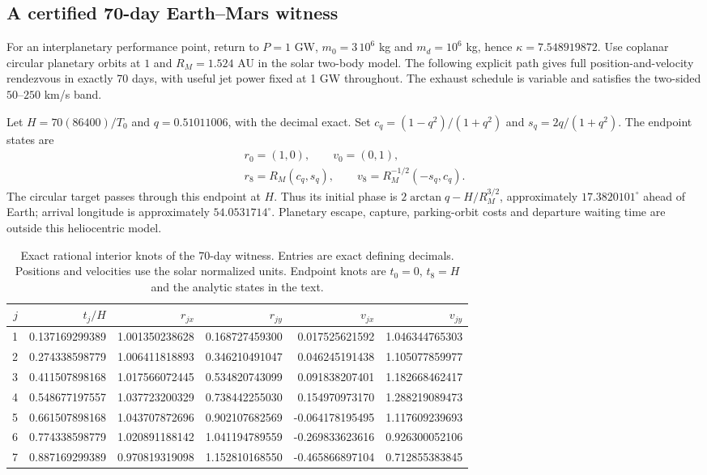 \subsection{A certified 70-day Earth--Mars witness}
\label{sec:marswitness}
For an interplanetary performance point, return to $P=1$ GW,
$m_0=3\,10^6$ kg and $m_d=10^6$ kg, hence
$\kappa=7.548919872$. Use coplanar circular planetary orbits at
$1$ and $R_M=1.524$ AU in the solar two-body model. The following
explicit path gives full position-and-velocity rendezvous in exactly
70 days, with useful jet power fixed at 1 GW throughout. The exhaust
schedule is variable and satisfies the two-sided $50$--$250$ km/s band.

Let $H=70(86400)/T_0$ and $q=0.51011006$, with the decimal exact.
Set $c_q=(1-q^2)/(1+q^2)$ and $s_q=2q/(1+q^2)$. The endpoint states are
\begin{equation}
\begin{gathered}
 r_0=(1,0),\qquad v_0=(0,1),\\
 r_8=R_M(c_q,s_q),\qquad
 v_8=R_M^{-1/2}(-s_q,c_q).
\end{gathered}
\end{equation}
The circular target passes through this endpoint at $H$. Thus its
initial phase is $2\arctan q-H/R_M^{3/2}$, approximately
$17.3820101^\circ$ ahead of Earth; arrival longitude is approximately
$54.0531714^\circ$. Planetary
escape, capture, parking-orbit costs and departure waiting time are
outside this heliocentric model.

\begin{table}[t]
\centering\small
\caption{Exact rational interior knots of the 70-day witness. Entries
are exact defining decimals. Positions and velocities use the solar normalized units.
Endpoint knots are $t_0=0$, $t_8=H$ and the analytic states in the text.}
\label{tab:marsknots}
\begin{tabular}{rrrrrr}\toprule
$j$ & $t_j/H$ & $r_{jx}$ & $r_{jy}$ & $v_{jx}$ & $v_{jy}$\\\midrule
1 & 0.137169299389 & 1.001350238628 & 0.168727459300 & 0.017525621592 & 1.046344765303\\
2 & 0.274338598779 & 1.006411818893 & 0.346210491047 & 0.046245191438 & 1.105077859977\\
3 & 0.411507898168 & 1.017566072445 & 0.534820743099 & 0.091838207401 & 1.182668462417\\
4 & 0.548677197557 & 1.037723200329 & 0.738442255030 & 0.154970973170 & 1.288219089473\\
5 & 0.661507898168 & 1.043707872696 & 0.902107682569 & -0.064178195495 & 1.117609239693\\
6 & 0.774338598779 & 1.020891188142 & 1.041194789559 & -0.269833623616 & 0.926300052106\\
7 & 0.887169299389 & 0.970819319098 & 1.152810168550 & -0.465866897104 & 0.712855383845\\
\bottomrule\end{tabular}
\end{table}

